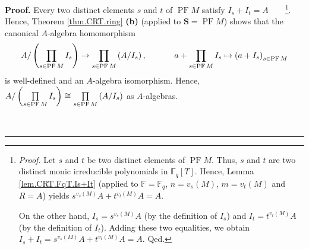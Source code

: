 \documentclass[numbers=enddot,12pt,final,onecolumn,notitlepage]{scrartcl}%
\theoremstyle{definition}
\newenvironment{proof}[1][Proof]{\noindent\textbf{#1.} }{\ \rule{0.5em}{0.5em}}
\let\prodnonlimits\prod
\renewcommand{\prod}{\prodnonlimits\limits}
\begin{document}
\begin{proof}
Every two distinct elements $s$ and $t$ of $\operatorname*{PF}M$ satisfy
$I_{s}+I_{t}=A$\ \ \ \ \footnote{\textit{Proof.} Let $s$ and $t$ be two
distinct elements of $\operatorname*{PF}M$. Thus, $s$ and $t$ are two distinct
monic irreducible polynomials in $\mathbb{F}_{q}\left[  T\right]  $. Hence,
Lemma \ref{lem.CRT.FqT.Is+It} (applied to $\mathbb{F}=\mathbb{F}_{q}$,
$n=v_{s}\left(  M\right)  $, $m=v_{t}\left(  M\right)  $ and $R=A$) yields
$s^{v_{s}\left(  M\right)  }A+t^{v_{t}\left(  M\right)  }A=A$.
\par
On the other hand, $I_{s}=s^{v_{s}\left(  M\right)  }A$ (by the definition of
$I_{s}$) and $I_{t}=t^{v_{t}\left(  M\right)  }A$ (by the definition of
$I_{t}$). Adding these two equalities, we obtain $I_{s}+I_{t}=s^{v_{s}\left(
M\right)  }A+t^{v_{t}\left(  M\right)  }A=A$. Qed.}. Hence, Theorem
\ref{thm.CRT.ring} \textbf{(b)} (applied to $\mathbf{S}=\operatorname*{PF}M$)
shows that the canonical $A$-algebra homomorphism
\[
A/\left(  \prod\limits_{s\in\operatorname*{PF}M}I_{s}\right)  \rightarrow
\prod\limits_{s\in\operatorname*{PF}M}\left(  A/I_{s}\right)
,\ \ \ \ \ \ \ \ \ \ a+\prod\limits_{s\in\operatorname*{PF}M}I_{s}%
\mapsto\left(  a+I_{s}\right)  _{s\in\operatorname*{PF}M}%
\]
is well-defined and an $A$-algebra isomorphism. Hence, $A/\left(
\prod\limits_{s\in\operatorname*{PF}M}I_{s}\right)  \cong\prod\limits_{s\in
\operatorname*{PF}M}\left(  A/I_{s}\right)  $ as $A$-algebras.


\end{proof}
\end{document}

